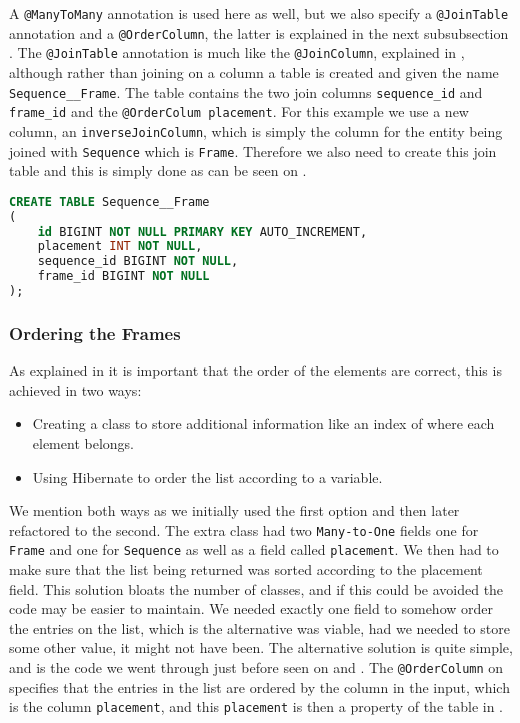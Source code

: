 A \texttt{@ManyToMany} annotation is used here as well, but we also specify a \texttt{@JoinTable} annotation and a \texttt{@OrderColumn}, the latter is explained in the next subsubsection .
The \texttt{@JoinTable} annotation is much like the \texttt{@JoinColumn}, explained in , although rather than joining on a column a table is created and given the name \texttt{Sequence\_\_Frame}.
The table contains the two join columns \texttt{sequence\_id} and \texttt{frame\_id} and the \texttt{@OrderColum placement}.
For this example we use a new column, an \texttt{inverseJoinColumn}, which is simply the column for the entity being joined with \texttt{Sequence} which is \texttt{Frame}.
Therefore we also need to create this join table and this is simply done as can be seen on .

\begin{lstlisting}[float, floatplacement=H, language=SQL, caption={The table creation of the join table between \texttt{Sequence} and \texttt{Frame}.},label={lst:sql-frame-sequence}]
CREATE TABLE Sequence__Frame
(
    id BIGINT NOT NULL PRIMARY KEY AUTO_INCREMENT,
    placement INT NOT NULL,
    sequence_id BIGINT NOT NULL,
    frame_id BIGINT NOT NULL
);
\end{lstlisting}

\subsubsection{Ordering the Frames}\label{ss:order}
As explained in  it is important that the order of the elements are correct, this is achieved in two ways:
\begin{itemize}
	\item Creating a class to store additional information like an index of where each element belongs.
	\item Using Hibernate to order the list according to a variable.
\end{itemize}

We mention both ways as we initially used the first option and then later refactored to the second.
The extra class had two \texttt{Many-to-One} fields one for \texttt{Frame} and one for \texttt{Sequence} as well as a field called \texttt{placement}.
We then had to make sure that the list being returned was sorted according to the placement field.
This solution bloats the number of classes, and if this could be avoided the code may be easier to maintain.
We needed exactly one field to somehow order the entries on the list, which is the alternative was viable, had we needed to store some other value, it might not have been.
The alternative solution is quite simple, and is the code we went through just before seen on  and .
The \texttt{@OrderColumn} on  specifies that the entries in the list are ordered by the column in the input, which is the column \texttt{placement}, and this \texttt{placement} is then a property of the table in .
